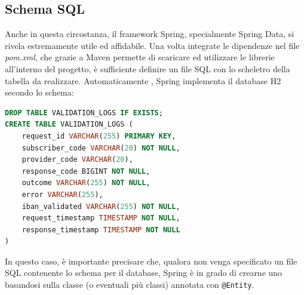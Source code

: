 \subsection{Schema SQL}
Anche in questa circostanza, il framework Spring, specialmente Spring Data, si rivela estremamente utile ed affidabile. Una volta integrate le dipendenze nel file \textit{pom.xml}, che grazie a Maven permette di scaricare ed utilizzare le librerie all’interno del progetto, è sufficiente definire un file SQL con lo scheletro della tabella da realizzare. Automaticamente , Spring implementa il database H2 secondo lo schema:
\begin{lstlisting}[language=SQL, caption=Schema SQL per la tracciatura delle richieste.]
DROP TABLE VALIDATION_LOGS IF EXISTS;
CREATE TABLE VALIDATION_LOGS (
    request_id VARCHAR(255) PRIMARY KEY,
    subscriber_code VARCHAR(20) NOT NULL,
    provider_code VARCHAR(20),
    response_code BIGINT NOT NULL,
    outcome VARCHAR(255) NOT NULL,
    error VARCHAR(255),
    iban_validated VARCHAR(255) NOT NULL,
    request_timestamp TIMESTAMP NOT NULL,
    response_timestamp TIMESTAMP NOT NULL
)
\end{lstlisting}
In questo caso, è importante precisare che, qualora non venga specificato un file SQL contenente lo schema per il database, Spring è in grado di crearne uno basandosi sulla classe (o eventuali più classi) annotata con \texttt{@Entity}.

